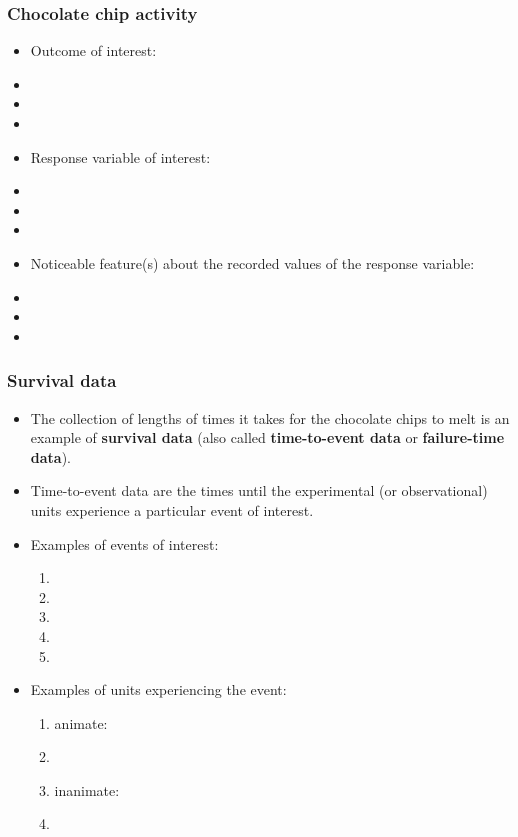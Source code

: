 \begin{frame}
\frametitle{Chocolate chip activity}
\begin{itemize}
\item Outcome of interest:
\item[] %
\item[]
\item[]
\item Response variable of interest:
\item[] %
\item[]
\item[]
\item Noticeable feature(s) about the recorded values of the response variable:
\item[] %
\item[] %
\item[]
\end{itemize}
\end{frame}

\begin{frame}
\frametitle{Survival data}
\begin{itemize}
\item The collection of lengths of times it takes for the chocolate chips to melt is an example of \textbf{survival data} (also called \textbf{time-to-event data} or \textbf{failure-time data}).
\item Time-to-event data are the times until the experimental (or observational) units experience a particular event
of interest.
\item Examples of events of interest:
\begin{enumerate}
\item %
\item %
\item %
\item %
\item %
\end{enumerate}
\item Examples of units experiencing the event:
\begin{enumerate}
\item[] animate: %
\item[]
\item[] inanimate: %
\item[]
\end{enumerate}
\end{itemize}
\end{frame}


